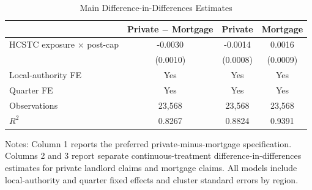 \begin{table}[H]
\centering
\caption{Main Difference-in-Differences Estimates}
\begin{threeparttable}
\begin{tabular}{lccc}
\toprule
 & Private $-$ Mortgage & Private & Mortgage \\
\midrule
HCSTC exposure $\times$ post-cap & -0.0030\sym{**} & -0.0014 & 0.0016 \\
 & (0.0010) & (0.0008) & (0.0009) \\
Local-authority FE & Yes & Yes & Yes \\
Quarter FE & Yes & Yes & Yes \\
Observations & 23,568 & 23,568 & 23,568 \\
$R^2$ & 0.8267 & 0.8824 & 0.9391 \\
\bottomrule
\end{tabular}
\begin{flushleft}
\small Notes: Column 1 reports the preferred private-minus-mortgage specification. Columns 2 and 3 report separate continuous-treatment difference-in-differences estimates for private landlord claims and mortgage claims. All models include local-authority and quarter fixed effects and cluster standard errors by region.
\end{flushleft}
\end{threeparttable}
\label{tab:main}
\end{table}

